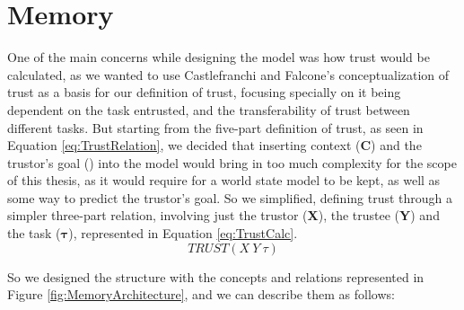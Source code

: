 \section{Memory}
\label{sec:Memory}
One of the main concerns while designing the model was how trust would be calculated, as we wanted to use Castlefranchi and Falcone's conceptualization of trust \cite{Castelfranchi2010} as a basis for our definition of trust, focusing specially on it being dependent on the task entrusted, and the transferability of trust between different tasks. But starting from the five-part definition of trust, as seen in Equation \ref{eq:TrustRelation}, we decided that inserting context (\textbf{C}) and the trustor's goal () into the model would bring in too much complexity for the scope of this thesis, as it would require for a world state model to be kept, as well as some way to predict the trustor's goal. So we simplified, defining trust through a simpler three-part relation, involving just the trustor (\textbf{X}), the trustee (\textbf{Y}) and the task ($\bm{\tau}$), represented in Equation \ref{eq:TrustCalc}.
\begin{equation}
TRUST(X\ Y\ \tau)
\label{eq:TrustCalc}
\end{equation}

So we designed the structure with the concepts and relations represented in Figure \ref{fig:MemoryArchitecture}, and we can describe them as follows:

